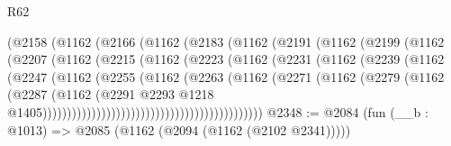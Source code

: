 \begin{lexlean}{R62}
\begin{coremodule}
                            (@2158
                              (@1162
                                (@2166
                                  (@1162
                                    (@2183
                                      (@1162
                                        (@2191
                                          (@1162
                                            (@2199
                                              (@1162
                                                (@2207
                                                  (@1162
                                                    (@2215
                                                      (@1162
                                                        (@2223
                                                          (@1162
                                                            (@2231
                                                              (@1162
                                                                (@2239
                                                                  (@1162
                                                                    (@2247
                                                                      (@1162
                                                                        (@2255
                                                                          (@1162
                                                                            (@2263
                                                                              (@1162
                                                                                (@2271
                                                                                  (@1162
                                                                                    (@2279
                                                                                      (@1162
                                                                                        (@2287
                                                                                          (@1162
                                                                                            (@2291
                                                                                              @2293
                                                                                              @1218
                                                                                              @1405)))))))))))))))))))))))))))))))))))))))))))))
@2348 := @2084 (fun (__b : @1013) => @2085 (@1162 (@2094 (@1162 (@2102 @2341)))))

\end{coremodule}
\end{lexlean}
